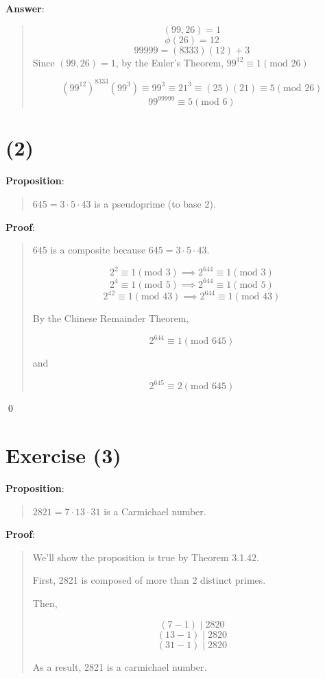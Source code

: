 \documentclass{article} %
\begin{document}
\bigskip
\noindent
\textbf{Answer}:
\begin{quote}
    \[(99, 26) = 1\]
    \[\phi(26) = 12\]
    \[99999 = (8333)(12) + 3\]
    Since $(99, 26) = 1$, by the Euler's Theorem, $99^{12} \equiv 1 (\text{mod }26)$

    \[(99^{12})^{8333} (99^3) \equiv 99^3 \equiv 21^3 \equiv (25)(21) \equiv 5 (\text{mod }26)\]
    \[\boxed{99^{99999} \equiv 5 (\text{mod }6)}\]
\end{quote}

\section*{(2)}

\bigskip
\noindent
\textbf{Proposition}:

\begin{quote}
    $645 = 3 \cdot 5 \cdot 43$ is a pseudoprime (to base 2).
\end{quote}

\bigskip
\noindent
\textbf{Proof}:
\begin{quote}
    645 is a composite because $645 = 3 \cdot 5 \cdot 43$.

    \[2^2 \equiv 1 (\text{mod }3)  \implies 2^{644} \equiv 1 (\text{mod }3)\]
    \[2^4 \equiv 1 (\text{mod }5)  \implies 2^{644} \equiv 1 (\text{mod }5)\]
    \[2^{42} \equiv 1 (\text{mod }43) \implies 2^{644} \equiv 1 (\text{mod }43)\]

    By the Chinese Remainder Theorem,

    \[2^{644} \equiv 1 (\text{mod }645)\]

    and

    \[\boxed{2^{645} \equiv 2 (\text{mod }645)}\]
\end{quote}
\qed
\bigskip

\section*{Exercise (3)}

\bigskip
\noindent
\textbf{Proposition}:
\begin{quote}
    $2821 = 7 \cdot 13 \cdot 31$ is a Carmichael number.
\end{quote}

\bigskip
\noindent
\textbf{Proof}:
\begin{quote}
    We'll show the proposition is true by Theorem 3.1.42.

    First, 2821 is composed of more than 2 distinct primes.

    Then,

    \[(7 - 1) \mid 2820\]
    \[(13 - 1) \mid 2820\]
    \[(31 - 1) \mid 2820\]

    As a result, 2821 is a carmichael number.
\end{quote}
\end{document}

